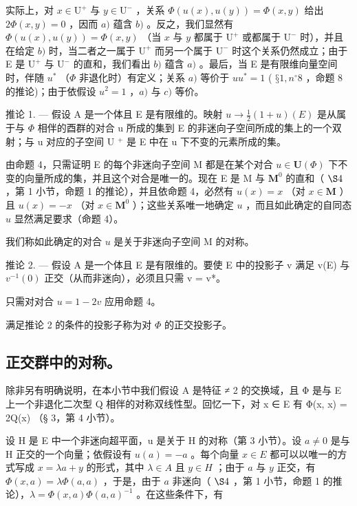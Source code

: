 实际上，对 \(x \in \mathrm{U}^{+}\) 与 \(y \in \mathrm{U}^{-}\) ，关系 \(\Phi(u(x), u(y)) = \Phi(x, y)\) 给出 \(2\Phi(x, y) = 0\) ，因而 \(a)\) 蕴含 \(b)\) 。反之，我们显然有 \(\Phi(u(x), u(y)) = \Phi(x, y)\) （当 \(x\) 与 \(y\) 都属于 \(\mathrm{U}^{+}\) 或都属于 \(\mathrm{U}^{-}\) 时），并且在给定 \(b)\) 时，当二者之一属于 \(\mathrm{U}^{+}\) 而另一个属于 \(\mathrm{U}^{-}\) 时这个关系仍然成立；由于 E 是 \(\mathrm{U}^{+}\) 与 \(\mathrm{U}^{-}\) 的直和，我们看出 \(b)\) 蕴含 \(a)\) 。最后，当 E 是有限维向量空间时，伴随 \(u^{*}\) （\(\Phi\) 非退化时）有定义；关系 \(a)\) 等价于 \(uu^{*} = 1\) ( \(§ 1, n^{\circ} 8\) ，命题 8 的推论)；由于依假设 \(u^{2} = 1\) ，\(a)\) 与 \(c)\) 等价。

推论 1. --- 假设 A 是一个体且 E 是有限维的。映射 \(u \to \frac{1}{2}(1 + u)(E)\) 是从属于与 \(\Phi\) 相伴的酉群的对合 u 所成的集到 E 的非迷向子空间所成的集上的一个双射；与 u 对应的子空间 U \(^+\) 是 E 中在 u 下不变的元素所成的集。

由命题 4，只需证明 E 的每个非迷向子空间 M 都是在某个对合 \(u \in \mathbf{U}(\Phi)\) 下不变的向量所成的集，并且这个对合是唯一的。现在 E 是 M 与 \(\mathbf{M}^0\) 的直和（ \(\S 4\) ，第 1 小节，命题 1 的推论），并且依命题 4，必然有 \(u(x) = x\) （对 \(x \in \mathbf{M}\) ）且 \(u(x) = -x\) （对 \(x \in \mathbf{M}^0\) ）；这些关系唯一地确定 \(u\) ，而且如此确定的自同态 \(u\) 显然满足要求（命题 4）。

我们称如此确定的对合 \(u\) 是关于非迷向子空间 M 的对称。

推论 2. --- 假设 A 是一个体且 E 是有限维的。要使 E 中的投影子 v 满足 v(E) 与 \(v^{-1}(0)\) 正交（从而非迷向），必须且只需 v = v*。

只需对对合 \(u = 1 - 2v\) 应用命题 4。

满足推论 2 的条件的投影子称为对 \(\Phi\) 的正交投影子。

\subsection{正交群中的对称。}

除非另有明确说明，在本小节中我们假设 A 是特征 ≠ 2 的交换域，且 Φ 是与 E 上一个非退化二次型 Q 相伴的对称双线性型。回忆一下，对 x ∈ E 有 Φ(x, x) = 2Q(x) （§ 3，第 4 小节）。

设 H 是 E 中一个非迷向超平面，u 是关于 H 的对称（第 3 小节）。设 \(a \neq 0\) 是与 H 正交的一个向量；依假设有 \(u(a) = -a\) 。每个向量 \(x \in E\) 都可以以唯一的方式写成 \(x = \lambda a + y\) 的形式，其中 \(\lambda \in A\) 且 \(y \in H\) ；由于 \(a\) 与 \(y\) 正交，有 \(\Phi(x, a) = \lambda \Phi(a, a)\) ，于是，由于 \(a\) 非迷向（ \(\S 4\) ，第 1 小节，命题 1 的推论），\(\lambda = \Phi(x, a) \Phi(a, a)^{-1}\) 。在这些条件下，有

